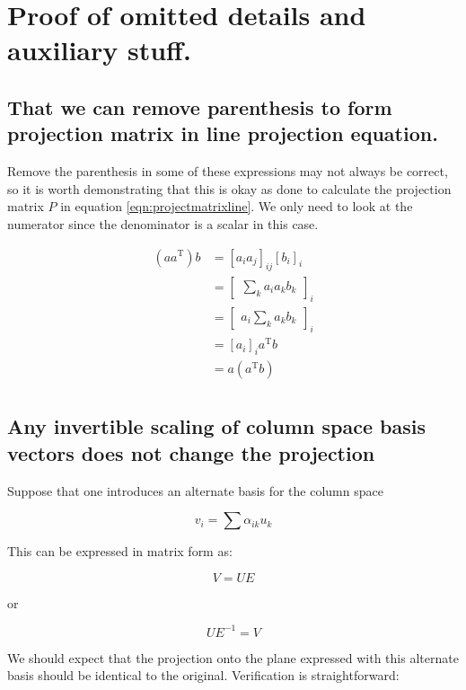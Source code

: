 \documentclass{article}      %
\newcommand{\transpose}[1]{{{#1}^{\text{T}}}}
\begin{document}
\section{ Proof of omitted details and auxiliary stuff. }

\subsection{ That we can remove parenthesis to form projection matrix in line projection equation. }

Remove the parenthesis in some of these expressions may not always be correct, so it is worth demonstrating that this is okay as
done to calculate the projection matrix $P$ in 
equation \ref{eqn:projectmatrixline}.
We only need to look at the numerator since the denominator is a scalar in this case.

\begin{align*}
(a \transpose{a}) b
&= [ a_i a_j ]_{ij} [b_i]_i \\
&= 
{\begin{bmatrix}
\sum_k a_i a_k b_k
\end{bmatrix}
}_i \\
&= 
{\begin{bmatrix}
a_i \sum_k a_k b_k
\end{bmatrix}
}_i \\
&= [ a_i ]_i \transpose{a} b \\
&= a (\transpose{a} b) \\
\end{align*}



\subsection{ Any invertible scaling of column space basis vectors does not change the projection }


Suppose that one introduces an alternate basis for the column space


\[
v_i = \sum \alpha_{ik} u_k
\]

This can be expressed in matrix form as:

\[
V = U E
\]

or

\[
U E^{-1} = V
\]

We should expect that the projection onto the plane expressed with this alternate basis should be identical to the original.  Verification
is straightforward:
\end{document}
